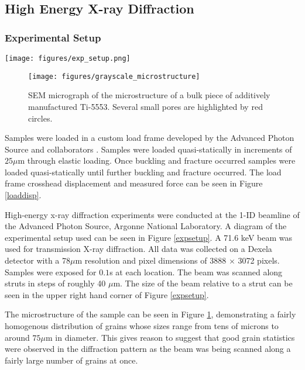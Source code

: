 \subsection{High Energy X-ray Diffraction}
\subsubsection{Experimental Setup}
\begin{figure*}[t]
	\texttt{[image: figures/exp\_setup.png]}
	\caption{The orientation of the part in the laboratory coordinate frame relative to the X-ray beam and the detector.}
	\label{expsetup}
\end{figure*}

%
\begin{figure}
	\texttt{[image: figures/grayscale\_microstructure]}
	\caption{SEM micrograph of the microstructure of a bulk piece of additively manufactured Ti-5553. Several small pores are highlighted by red circles.}
	\label{microstructure}
\end{figure}

Samples were loaded in a custom load frame developed by the Advanced Photon Source and collaborators \cite{Loadframe}. Samples were loaded quasi-statically in increments of $25 \mu$m through elastic loading. Once buckling and fracture occurred samples were loaded quasi-statically until further buckling and fracture occurred. The load frame crosshead displacement and measured force can be seen in Figure \ref{loaddisp}.

High-energy x-ray diffraction experiments were conducted at the 1-ID beamline of the Advanced Photon Source, Argonne National Laboratory. A diagram of the experimental setup used can be seen in Figure \ref{expsetup}. A 71.6 keV beam was used for transmission X-ray diffraction. All data was collected on a Dexela detector with a 78$\mu$m resolution and pixel dimensions of 3888 $\times$ 3072 pixels. Samples were exposed for $0.1$s at each location. The beam was scanned along struts in steps of roughly 40 $\mu$m. The size of the beam relative to a strut can be seen in the upper right hand corner of Figure \ref{expsetup}.%

The microstructure of the sample can be seen in Figure \ref{microstructure}, demonstrating a fairly homogenous distribution of grains whose sizes range from tens of microns to around $75\mu$m in diameter. This gives reason to suggest that good grain statistics were observed in the diffraction pattern as the beam was being scanned along a fairly large number of grains at once.

